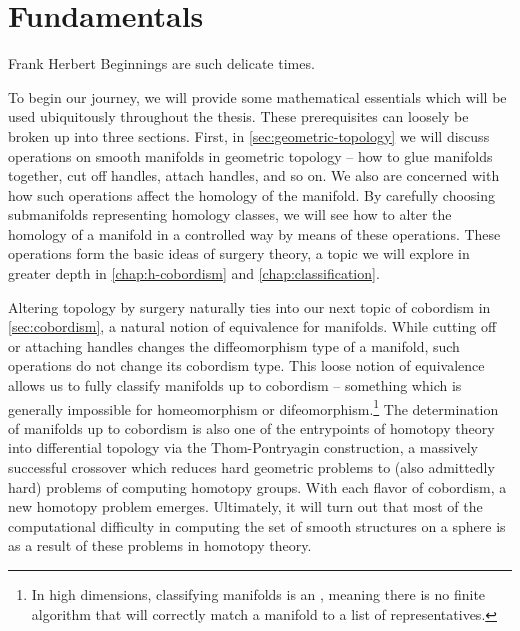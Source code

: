 \chapter{Fundamentals}\label{chap:fundamentals}

\begin{epigraph}{16em}{Frank Herbert}
	Beginnings are such delicate times.
\end{epigraph}

To begin our journey, we will provide some mathematical essentials which will be used ubiquitously throughout the thesis. These prerequisites can loosely be broken up into three sections. First, in \cref{sec:geometric-topology} we will discuss operations on smooth manifolds in geometric topology -- how to glue manifolds together, cut off handles, attach handles, and so on. We also are concerned with how such operations affect the homology of the manifold. By carefully choosing submanifolds representing homology classes, we will see how to alter the homology of a manifold in a controlled way by means of these operations. These operations form the basic ideas of surgery theory, a topic we will explore in greater depth in \cref{chap:h-cobordism} and \cref{chap:classification}. 

Altering topology by surgery naturally ties into our next topic of cobordism in \cref{sec:cobordism}, a natural notion of equivalence for manifolds. While cutting off or attaching handles changes the diffeomorphism type of a manifold, such operations do not change its cobordism type. This loose notion of equivalence allows us to fully classify manifolds up to cobordism -- something which is generally impossible for homeomorphism or difeomorphism.\footnote{In high dimensions, classifying manifolds is an , meaning there is no finite algorithm that will correctly match a manifold to a list of representatives.}
The determination of manifolds up to cobordism is also one of the entrypoints of homotopy theory into differential topology via the Thom-Pontryagin construction, a massively successful crossover which reduces hard geometric problems to (also admittedly hard) problems of computing homotopy groups. With each flavor of cobordism, a new homotopy problem emerges. Ultimately, it will turn out that most of the computational difficulty in computing the set of smooth structures on a sphere is as a result of these problems in homotopy theory.


